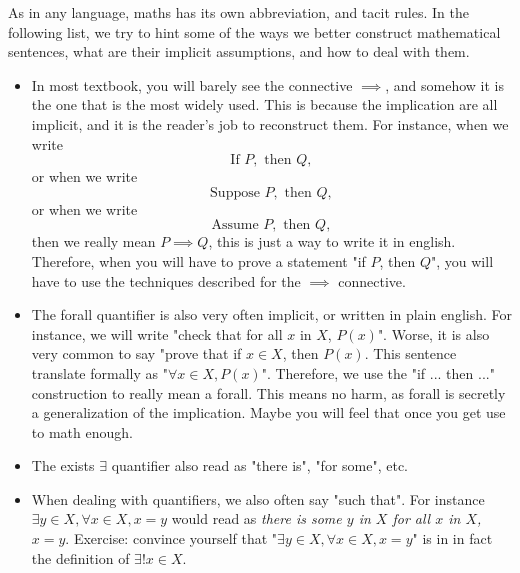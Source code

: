 As in any language, maths has its own abbreviation, and tacit rules. In the following list, we try to hint some of the ways we better construct mathematical sentences, what are their implicit assumptions, and how to deal with them.
\begin{itemize}
    \item In most textbook, you will barely see the connective \( \implies \), and somehow it is the one that is the most widely used. This is because the implication are all implicit, and it is the reader's job to reconstruct them. For instance, when we write
    \begin{equation*}
        \text{If } P, \text{ then }Q,
    \end{equation*}
    or when we write
    \begin{equation*}
        \text{Suppose } P, \text{ then }Q,
    \end{equation*}
    or when we write
    \begin{equation*}
        \text{Assume } P, \text{ then }Q,
    \end{equation*}
    then we really mean \( P \implies Q \), this is just a way to write it in english. Therefore, when you will have to prove a statement "if \( P \), then \( Q \)", you will have to use the techniques described for the \( \implies \) connective.

    \item The forall quantifier is also very often implicit, or written in plain english. For instance, we will write "check that for all \( x \) in \( X \), \( P(x) \)". Worse, it is also very common to say "prove that if \( x \in X \), then \( P(x) \). This sentence translate formally as "\( \forall x \in X, P(x) \)". Therefore, we use the "if ... then ..." construction to really mean a forall. This means no harm, as forall is secretly a generalization of the implication. Maybe you will feel that once you get use to math enough. 
    
    \item The exists \( \exists \) quantifier also read as "there is", "for some", etc.
    
    \item When dealing with quantifiers, we also often say "such that". For instance \( \exists y \in X, \forall x \in X, x = y \) would read as \textit{there is some \( y \) in \( X \)  for all \( x \) in \( X \), \( x = y \)}. Exercise: convince yourself that "\( \exists y \in X, \forall x \in X, x = y \)" is in in fact the definition of \( \exists! x \in X \). 
    

\end{itemize}
